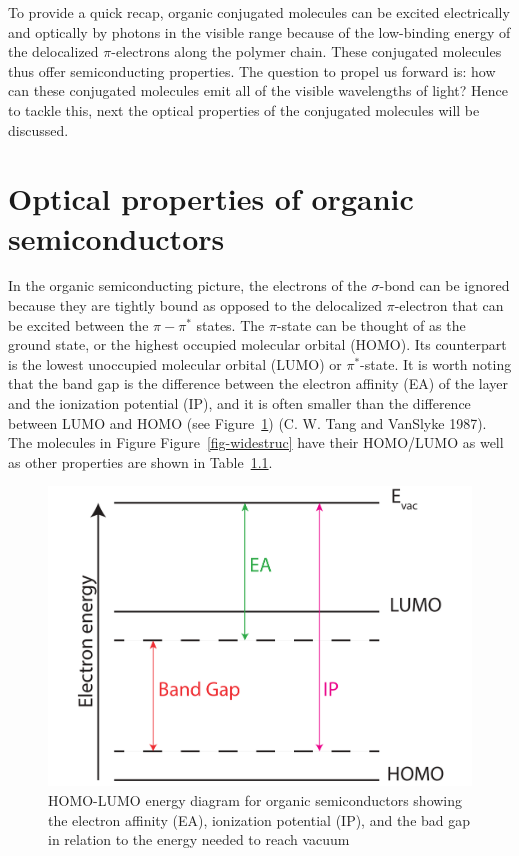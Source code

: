 \documentclass[
  letterpaper,
  DIV=11,
  numbers=noendperiod,
  oneside]{scrreprt}
\begin{document}
To provide a quick recap, organic conjugated molecules can be excited
electrically and optically by photons in the visible range because of
the low-binding energy of the delocalized \(\pi\)-electrons along the
polymer chain. These conjugated molecules thus offer semiconducting
properties. The question to propel us forward is: how can these
conjugated molecules emit all of the visible wavelengths of light? Hence
to tackle this, next the optical properties of the conjugated molecules
will be discussed.

\hypertarget{sec-opti}{%
\section{Optical properties of organic semiconductors}\label{sec-opti}}

In the organic semiconducting picture, the electrons of the
\(\sigma\)-bond can be ignored because they are tightly bound as opposed
to the delocalized \(\pi\)-electron that can be excited between the
\(\pi-\pi^*\) states. The \(\pi\)-state can be thought of as the ground
state, or the highest occupied molecular orbital (HOMO). Its counterpart
is the lowest unoccupied molecular orbital (LUMO) or \(\pi^*\)-state. It
is worth noting that the band gap is the difference between the electron
affinity (EA) of the layer and the ionization potential (IP), and it is
often smaller than the difference between LUMO and HOMO (see
Figure~\ref{fig-homo}) (C. W. Tang and VanSlyke 1987). The molecules in
Figure Figure~\ref{fig-widestruc} have their HOMO/LUMO as well as other
properties are shown in Table~\protect\hyperlink{tab:molecules}{1.1}.

\begin{figure}

{\centering \includegraphics{./images/HOMOLUMO1.pdf}

}

\caption{\label{fig-homo}HOMO-LUMO energy diagram for organic
semiconductors showing the electron affinity (EA), ionization potential
(IP), and the bad gap in relation to the energy needed to reach vacuum}

\end{figure}
\end{document}
